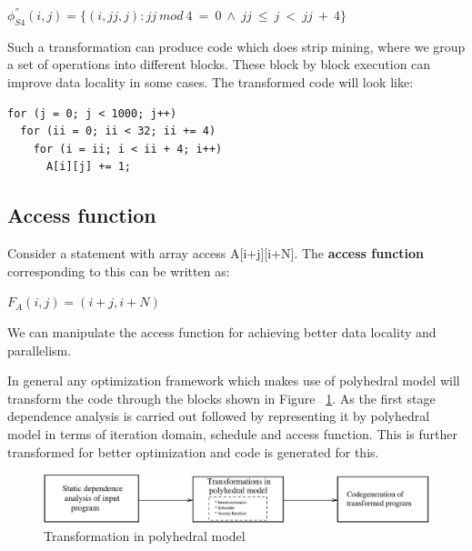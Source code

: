 \begin{center}
$\phi^{''}_{S4}(i,j) = \{(i,jj,j):jj\ mod\ 4\ =\ 0\ \wedge\ jj\ \leq\ j\ <\ jj\ +\ 4\}$
\end{center}

\noindent
Such a transformation can produce code which does strip mining, where we group
a set of operations into different blocks. These block by block execution can improve
data locality in some cases. The transformed code will look like:


{\footnotesize
\begin{lstlisting}
for (j = 0; j < 1000; j++)
  for (ii = 0; ii < 32; ii += 4)
    for (i = ii; i < ii + 4; i++)
      A[i][j] += 1;
\end{lstlisting}
}

\subsection{Access function}
Consider a statement with array access A[i+j][i+N]. The \textbf{access function} corresponding to this can be written
as:
\begin{center}
$F_A(i,j) = (i+j,i+N)$
\end{center}
We can manipulate the access function for achieving better data locality and parallelism.

In general any optimization framework which makes use of polyhedral model will
transform the code through the blocks shown in Figure ~\ref{fig:poly_steps}.
As the first stage dependence analysis is carried out followed by representing
it by polyhedral model in terms of iteration domain, schedule and access function.
This is further transformed for better optimization and code is generated
for this.
\begin{figure}
  \includegraphics[width=1\textwidth]{images/poly_steps.eps}
  \caption{Transformation in polyhedral model}
  \label{fig:poly_steps}
\end{figure}
